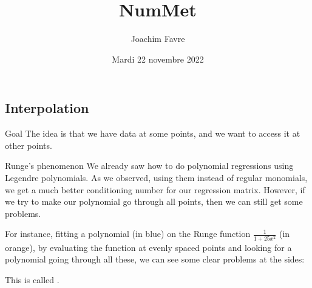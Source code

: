 \documentclass[a4paper]{article}
\title{NumMet}
\author{Joachim Favre}
\date{Mardi 22 novembre 2022}
\begin{document}
\maketitle


\subsection{Interpolation}
\begin{parag}{Goal}
    The idea is that we have data at some points, and we want to access it at other points. 
\end{parag}

\begin{parag}{Runge's phenomenon}
    We already saw how to do polynomial regressions using Legendre polynomials. As we observed, using them instead of regular monomials, we get a much better conditioning number for our regression matrix. However, if we try to make our polynomial go through all points, then we can still get some problems. 

    For instance, fitting a polynomial (in blue) on the Runge function $\frac{1}{1 + 25x^2}$ (in orange), by evaluating the function at evenly spaced points and looking for a polynomial going through all these, we can see some clear problems at the sides:

    This is called .
\end{parag}
\end{document}
